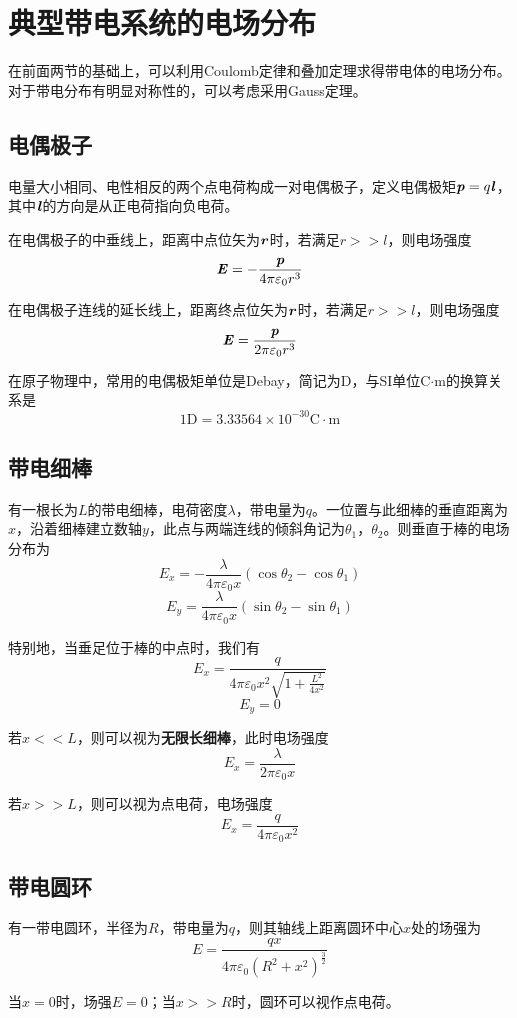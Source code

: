 \documentclass[UTF8,openany]{book}
\begin{document}
	\section{典型带电系统的电场分布}
	在前面两节的基础上，可以利用Coulomb定律和叠加定理求得带电体的电场分布。对于带电分布有明显对称性的，可以考虑采用Gauss定理。
	\subsection{电偶极子}
	电量大小相同、电性相反的两个点电荷构成一对电偶极子，定义电偶极矩$\textbf{\textit{p}}=q\textbf{\textit{l}}$，其中$\textbf{\textit{l}}$的方向是从正电荷指向负电荷。
	\par 在电偶极子的中垂线上，距离中点位矢为$\textbf{\textit{r}}$时，若满足$r>>l$，则电场强度
	$$\textbf{\textit{E}}=-\frac{\textbf{\textit{p}}}{4\pi\varepsilon_0r^3}$$
	\par 在电偶极子连线的延长线上，距离终点位矢为$\textbf{\textit{r}}$时，若满足$r>>l$，则电场强度
	$$\textbf{\textit{E}}=\frac{\textbf{\textit{p}}}{2\pi\varepsilon_0r^3}$$
	\par 在原子物理中，常用的电偶极矩单位是Debay，简记为D，与SI单位C$\cdot$m的换算关系是
	$$1\mathrm{D}=3.33564\times10^{-30}\mathrm{C\cdot m}$$
	\subsection{带电细棒}
	有一根长为$L$的带电细棒，电荷密度$\lambda$，带电量为$q$。一位置与此细棒的垂直距离为$x$，沿着细棒建立数轴$y$，此点与两端连线的倾斜角记为$\theta_1$，$\theta_2$。则垂直于棒的电场分布为
	$$E_x=-\frac{\lambda}{4\pi\varepsilon_0x}(\cos\theta_2-\cos\theta_1)$$
	$$E_y=\frac{\lambda}{4\pi\varepsilon_0x}(\sin\theta_2-\sin\theta_1)$$
	\par 特别地，当垂足位于棒的中点时，我们有
	$$E_x=\frac{q}{4\pi\varepsilon_0x^2\sqrt{1+\frac{L^2}{4x^2}}}$$
	$$E_y=0$$
	\par 若$x<<L$，则可以视为\textbf{无限长细棒}，此时电场强度
	$$E_x=\frac{\lambda}{2\pi\varepsilon_0x}$$
	\par 若$x>>L$，则可以视为点电荷，电场强度
	$$E_x=\frac{q}{4\pi\varepsilon_0x^2}$$
	\subsection{带电圆环}
	有一带电圆环，半径为$R$，带电量为$q$，则其轴线上距离圆环中心$x$处的场强为
	$$E=\frac{qx}{4\pi\varepsilon_0(R^2+x^2)^{\frac{3}{2}}}$$
	\par 当$x=0$时，场强$E=0$；当$x>>R$时，圆环可以视作点电荷。
\end{document}
